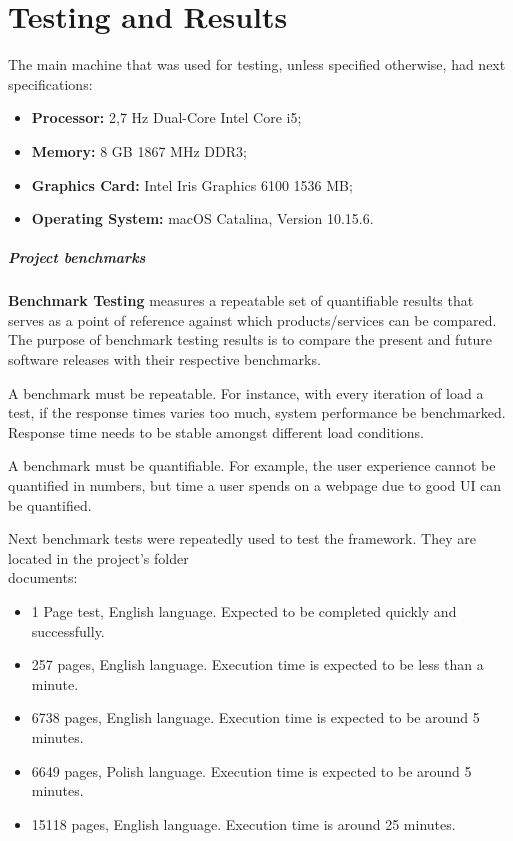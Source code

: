 \documentclass[thesis=M,english,hidelinks]{FITthesis}[2019/12/23]
\begin{document}
\chapter{Testing and Results}

The main machine that was used for testing, unless specified otherwise, had next specifications:
\begin{itemize}
	\item \textbf{Processor:} 2,7 Hz Dual-Core Intel Core i5;
	\item \textbf{Memory:} 8 GB 1867 MHz DDR3;
	\item \textbf{Graphics Card:} Intel Iris Graphics 6100 1536 MB;
	\item \textbf{Operating System:} macOS Catalina, Version 10.15.6.
\end{itemize}

\paragraph{Project benchmarks}

\textbf{Benchmark Testing} measures a repeatable set of quantifiable results that serves as a point of reference against which products/services can be compared. The purpose of benchmark testing results is to compare the present and future software releases with their respective benchmarks.

A benchmark must be repeatable. For instance, with every iteration of load a test, if the response times varies too much, system performance be benchmarked. Response time needs to be stable amongst different load conditions.

A benchmark must be quantifiable. For example, the user experience cannot be quantified in numbers, but time a user spends on a webpage due to good UI can be quantified.

Next benchmark tests were repeatedly used to test the framework. They are located in the project's folder \\documents:

\begin{itemize}
	\item 1 Page test, English language. Expected to be completed quickly and successfully.
	\item 257 pages, English language. Execution time is expected to be less than a minute.
	\item 6738 pages, English language. Execution time is expected to be around 5 minutes.
	\item 6649 pages, Polish language. Execution time is expected to be around 5 minutes.
	\item 15118 pages, English language. Execution time is around 25 minutes.
\end{itemize}
\end{document}
